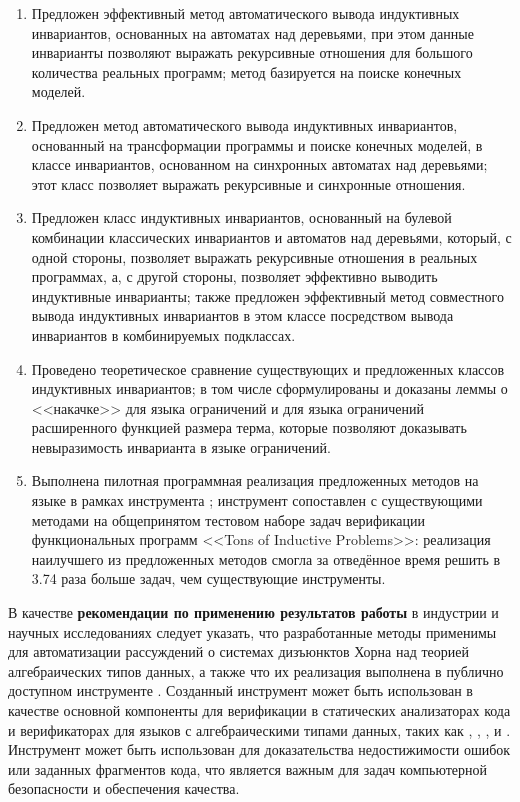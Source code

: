 
\begin{enumerate}
\item Предложен эффективный метод автоматического вывода индуктивных инвариантов, основанных на автоматах над деревьями, при этом данные инварианты позволяют выражать рекурсивные отношения для большого количества реальных программ; метод базируется на поиске конечных моделей.
\item Предложен метод автоматического вывода индуктивных инвариантов, основанный на трансформации программы и поиске конечных моделей, в классе инвариантов, основанном на синхронных автоматах над деревьями; этот класс позволяет выражать рекурсивные и синхронные отношения.
\item Предложен класс индуктивных инвариантов, основанный на булевой комбинации классических инвариантов и автоматов над деревьями, который, с одной стороны, позволяет выражать рекурсивные отношения в реальных программах, а, с другой стороны, позволяет эффективно выводить индуктивные инварианты; также предложен эффективный метод совместного вывода индуктивных инвариантов в этом классе посредством вывода инвариантов в комбинируемых подклассах.
\item Проведено теоретическое сравнение существующих и предложенных классов индуктивных инвариантов; в том числе сформулированы и доказаны леммы о <<накачке>> для языка ограничений и для языка ограничений расширенного функцией размера терма, которые позволяют доказывать невыразимость инварианта в языке ограничений.
\item Выполнена пилотная программная реализация предложенных методов на языке \fsharp{} в рамках инструмента \theringen{}; инструмент сопоставлен с существующими методами на общепринятом тестовом наборе задач верификации функциональных программ <<Tons of Inductive Problems>>: реализация наилучшего из предложенных методов смогла за отведённое время решить в 3.74 раза больше задач, чем существующие инструменты.
\end{enumerate}

В качестве \textbf{рекомендации по применению результатов работы} в индустрии и научных исследованиях следует указать, что разработанные методы применимы для автоматизации рассуждений о системах дизъюнктов Хорна над теорией алгебраических типов данных, а также что их реализация выполнена в публично доступном инструменте \theringen{}. Созданный инструмент может быть использован в качестве основной компоненты для верификации в статических анализаторах кода и верификаторах для языков с алгебраическими типами данных, таких как \rust{}, \scala{}, \solidity{}, \haskell{} и \ocaml{}. Инструмент может быть использован для доказательства недостижимости ошибок или заданных фрагментов кода, что является важным для задач компьютерной безопасности и обеспечения качества.

